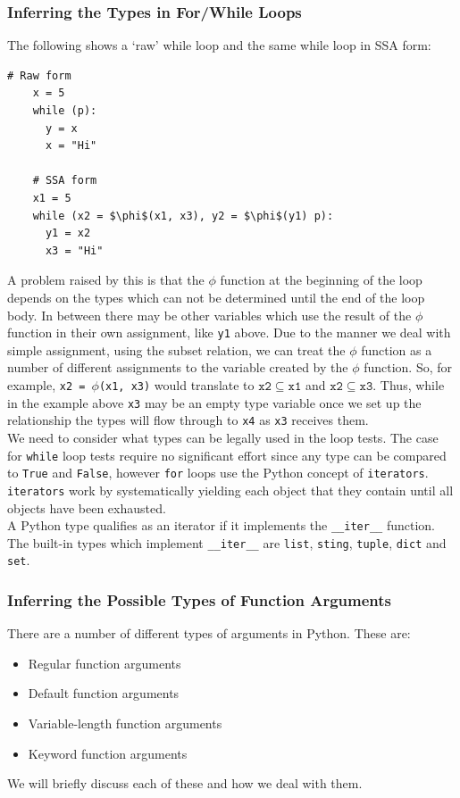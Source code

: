 \documentclass[12pt, titlepage]{article}
\begin{document}
\subsubsection{Inferring the Types in For/While Loops}
The following shows a `raw' while loop and the same while loop in SSA form:
\begin{lstlisting}[mathescape]
    # Raw form
    x = 5
    while (p):
      y = x
      x = "Hi"
	
    # SSA form
    x1 = 5
    while (x2 = $\phi$(x1, x3), y2 = $\phi$(y1) p):
      y1 = x2
      x3 = "Hi"
\end{lstlisting}
A problem raised by this is that the $\phi$ function at the beginning of the loop depends on the types which can not be determined until the end of the loop body. In between there may be other variables which use the result of the $\phi$ function in their own assignment, like \texttt{y1} above. Due to the manner we deal with simple assignment, using the subset relation, we can treat the $\phi$ function as a number of different assignments to the variable created by the $\phi$ function. So, for example, \texttt{x2 = $\phi$(x1, x3)} would translate to $\mathtt{x2 \subseteq x1}$ and $\mathtt{x2 \subseteq x3}$. Thus, while in the example above \texttt{x3} may be an empty type variable once we set up the relationship the types will flow through to \texttt{x4} as \texttt{x3} receives them. \\
\indent We need to consider what types can be legally used in the loop tests. The case for \texttt{while} loop tests require no significant effort since any type can be compared to \texttt{True} and \texttt{False}, however \texttt{for} loops use the Python concept of \texttt{iterators}. \texttt{iterators} work by systematically yielding each object that they contain until all objects have been exhausted. \\
\indent A Python type qualifies as an iterator if it implements the \texttt{\_\_iter\_\_} function. The built-in types which implement \texttt{\_\_iter\_\_} are \texttt{list}, \texttt{sting}, \texttt{tuple}, \texttt{dict} and \texttt{set}.


\subsubsection{Inferring the Possible Types of Function Arguments}
\label{chap:inferringFuncArgs}
There are a number of different types of arguments in Python. These are:
\begin{itemize}
	\item Regular function arguments
	\item Default function arguments
	\item Variable-length function arguments
	\item Keyword function arguments
\end{itemize}
We will briefly discuss each of these and how we deal with them.
\end{document}
